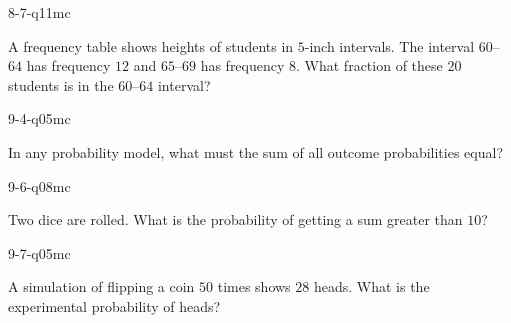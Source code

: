 \begin{practiceQuestion}{8-7-q11}{mc}
\begin{questionText}
A frequency table shows heights of students in $5$-inch intervals. The interval $60$--$64$ has frequency $12$ and $65$--$69$ has frequency $8$. What fraction of these $20$ students is in the $60$--$64$ interval?
\end{questionText}
\end{practiceQuestion}

\begin{practiceQuestion}{9-4-q05}{mc}
\begin{questionText}
In any probability model, what must the sum of all outcome probabilities equal?
\end{questionText}
\end{practiceQuestion}

\begin{practiceQuestion}{9-6-q08}{mc}
\begin{questionText}
Two dice are rolled. What is the probability of getting a sum greater than $10$?
\end{questionText}
\end{practiceQuestion}

\begin{practiceQuestion}{9-7-q05}{mc}
\begin{questionText}
A simulation of flipping a coin $50$ times shows $28$ heads. What is the experimental probability of heads?
\end{questionText}
\end{practiceQuestion}
